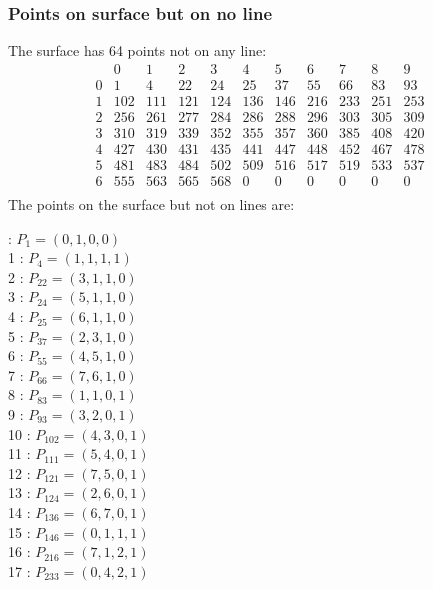 \documentclass{article}
\begin{document}
{\subsubsection*{Points on surface but on no line}
The surface has 64 points not on any line:\\
$$
\begin{array}{r|*{10}{r}}
 & 0 & 1 & 2 & 3 & 4 & 5 & 6 & 7 & 8 & 9\\
\hline
0 & 1 & 4 & 22 & 24 & 25 & 37 & 55 & 66 & 83 & 93\\
1 & 102 & 111 & 121 & 124 & 136 & 146 & 216 & 233 & 251 & 253\\
2 & 256 & 261 & 277 & 284 & 286 & 288 & 296 & 303 & 305 & 309\\
3 & 310 & 319 & 339 & 352 & 355 & 357 & 360 & 385 & 408 & 420\\
4 & 427 & 430 & 431 & 435 & 441 & 447 & 448 & 452 & 467 & 478\\
5 & 481 & 483 & 484 & 502 & 509 & 516 & 517 & 519 & 533 & 537\\
6 & 555 & 563 & 565 & 568 & 0 & 0 & 0 & 0 & 0 & 0\\
\end{array}
$$
The points on the surface but not on lines are:\\
\begin{multicols}{2}
 : $P_{1}=( 0, 1, 0, 0 )$\\
1 : $P_{4}=( 1, 1, 1, 1 )$\\
2 : $P_{22}=( 3, 1, 1, 0 )$\\
3 : $P_{24}=( 5, 1, 1, 0 )$\\
4 : $P_{25}=( 6, 1, 1, 0 )$\\
5 : $P_{37}=( 2, 3, 1, 0 )$\\
6 : $P_{55}=( 4, 5, 1, 0 )$\\
7 : $P_{66}=( 7, 6, 1, 0 )$\\
8 : $P_{83}=( 1, 1, 0, 1 )$\\
9 : $P_{93}=( 3, 2, 0, 1 )$\\
10 : $P_{102}=( 4, 3, 0, 1 )$\\
11 : $P_{111}=( 5, 4, 0, 1 )$\\
12 : $P_{121}=( 7, 5, 0, 1 )$\\
13 : $P_{124}=( 2, 6, 0, 1 )$\\
14 : $P_{136}=( 6, 7, 0, 1 )$\\
15 : $P_{146}=( 0, 1, 1, 1 )$\\
16 : $P_{216}=( 7, 1, 2, 1 )$\\
17 : $P_{233}=( 0, 4, 2, 1 )$\\

\end{multicols}}
\end{document}
